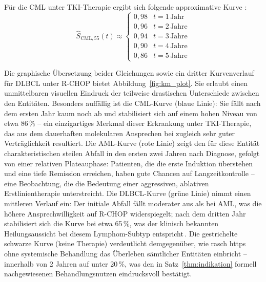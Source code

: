 ﻿\documentclass[12pt,a4paper]{article}
\theoremstyle{definition}
\begin{document}
Für die CML unter TKI-Therapie ergibt sich folgende approximative Kurve
\cite{hochhaus2017}:
\begin{equation}
  \hat{S}_{\mathrm{CML},55}(t) \approx
  \begin{cases}
    0{,}98 & t = 1\,\text{Jahr} \\
    0{,}96 & t = 2\,\text{Jahre} \\
    0{,}94 & t = 3\,\text{Jahre} \\
    0{,}90 & t = 4\,\text{Jahre} \\
    0{,}86 & t = 5\,\text{Jahre}
  \end{cases}
  \label{eq:km_cml}
\end{equation}

Die graphische Übersetzung beider Gleichungen sowie ein dritter Kurvenverlauf
für DLBCL unter R-CHOP bietet Abbildung~\ref{fig:km_plot}. Sie erlaubt einen
unmittelbaren visuellen Eindruck der teilweise drastischen Unterschiede zwischen
den Entitäten. Besonders auffällig ist die CML-Kurve (blaue Linie): Sie fällt
nach dem ersten Jahr kaum noch ab und stabilisiert sich auf einem hohen Niveau
von etwa 86\,\% -- ein einzigartiges Merkmal dieser Erkrankung unter TKI-Therapie,
das aus dem dauerhaften molekularen Ansprechen bei zugleich sehr guter
Verträglichkeit resultiert. Die AML-Kurve (rote Linie) zeigt den für diese
Entität charakteristischen steilen Abfall in den ersten zwei Jahren nach Diagnose,
gefolgt von einer relativen Plateauphase: Patienten, die die erste Induktion
überstehen und eine tiefe Remission erreichen, haben gute Chancen auf
Langzeitkontrolle -- eine Beobachtung, die die Bedeutung einer aggressiven,
ablativen Erstlinientherapie unterstreicht. Die DLBCL-Kurve (grüne Linie) nimmt
einen mittleren Verlauf ein: Der initiale Abfall fällt moderater aus als bei AML,
was die höhere Ansprechwilligkeit auf R-CHOP widerspiegelt; nach dem dritten
Jahr stabilisiert sich die Kurve bei etwa 65\,\%, was der klinisch bekannten
Heilungsaussicht bei diesem Lymphom-Subtyp entspricht\,\cite{coiffier2002}. Die
gestrichelte schwarze Kurve (keine Therapie) verdeutlicht demgegenüber, wie rasch
https ohne systemische Behandlung das Überleben sämtlicher Entitäten einbricht
-- innerhalb von 2 Jahren auf unter 20\,\%, was den in Satz~\ref{thm:indikation}
formell nachgewiesenen Behandlungsnutzen eindrucksvoll bestätigt.
\end{document}
